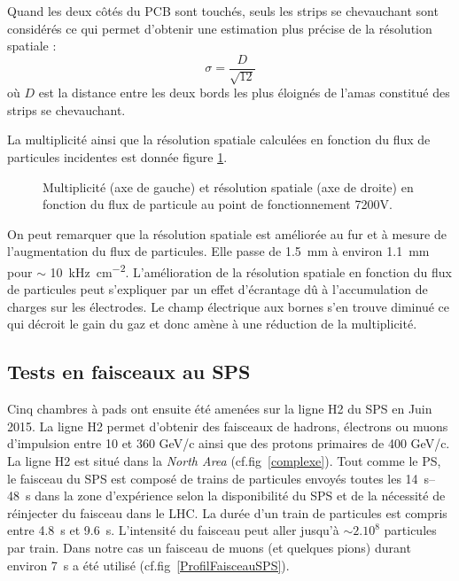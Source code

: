 Quand les deux côtés du PCB sont touchés, seuls les strips se chevauchant sont considérés ce qui permet d'obtenir une estimation plus précise de la résolution spatiale :
\begin{equation}
\sigma=\frac{D}{\sqrt{12}}
\end{equation} 
où $D$ est la distance entre les deux bords les plus éloignés de l'amas constitué des strips se chevauchant.

La multiplicité ainsi que la résolution spatiale calculées en fonction du flux de particules incidentes est donnée figure \ref{ResoSpatialPS}. 

\begin{figure}[!ht]
	\centering
	\caption{Multiplicité (axe de gauche) et résolution spatiale (axe de droite) en fonction du flux de particule au point de fonctionnement 7200V.}
	\label{ResoSpatialPS}
\end{figure}

On peut remarquer que la résolution spatiale est améliorée au fur et à mesure de l'augmentation du flux de particules. Elle passe de \SI{1.5}{\milli\meter} à environ \SI{1.1}{\milli\meter} pour $\sim$ \SI{10}{\kilo\hertz\per\square\centi\meter}. L'amélioration de la résolution spatiale en fonction du flux de particules peut s'expliquer par un effet d'écrantage dû à l'accumulation de charges sur les électrodes. Le champ électrique aux bornes s'en trouve diminué ce qui décroit le gain du gaz et donc amène à une réduction de la multiplicité.

\subsection{Tests en faisceaux au SPS} 
Cinq chambres à pads ont ensuite été amenées sur la ligne H2 \cite{H2line} du SPS en Juin 2015. La ligne H2 permet d'obtenir des faisceaux de hadrons, électrons ou muons d'impulsion entre 10 et 360 GeV/c ainsi que des protons primaires de 400 GeV/c. La ligne H2 est situé dans la \textit{North Area} (cf.fig~\ref{complexe}). Tout comme le PS, le faisceau du SPS est composé de trains de particules envoyés toutes les \SIrange{14}{48}{\second} dans la zone d’expérience selon la disponibilité du SPS et de la nécessité de réinjecter du faisceau dans le LHC. La durée d’un train de particules est compris entre \SI{4.8}{\second} et \SI{9.6}{\second}. L'intensité du faisceau peut aller jusqu'à $\sim 2.10^{8}$ particules par train. Dans notre cas un faisceau de muons (et quelques pions) durant environ \SI{7}{\second} a été utilisé (cf.fig~\ref{ProfilFaisceauSPS}).

